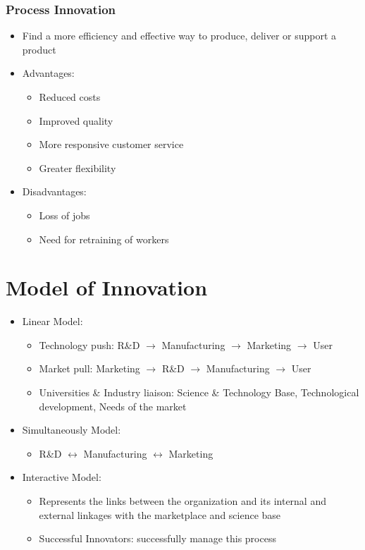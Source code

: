\documentclass[openany,12pt,a4paper]{book}
\begin{document}
\subsubsection{Process Innovation}
\begin{itemize}
    \item Find a more efficiency and effective way to produce, deliver or support a product
    \item Advantages:
    \begin{itemize}
        \item Reduced costs
        \item Improved quality
        \item More responsive customer service
        \item Greater flexibility
    \end{itemize}
    \item Disadvantages:
    \begin{itemize}
        \item Loss of jobs
        \item Need for retraining of workers
    \end{itemize}
\end{itemize}

\section{Model of Innovation}
\begin{itemize}
    \item Linear Model:
    \begin{itemize}
        \item Technology push: R\&D $\to$ Manufacturing $\to$ Marketing $\to$ User
        \item Market pull: Marketing $\to$ R\&D $\to$ Manufacturing $\to$ User
        \item Universities \& Industry liaison: Science \& Technology Base, Technological development, Needs of the market
    \end{itemize}
    \item Simultaneously Model:
    \begin{itemize}
        \item R\&D $\leftrightarrow$ Manufacturing $\leftrightarrow$ Marketing
    \end{itemize}
    \item Interactive Model:
    \begin{itemize}
        \item Represents the links between the organization and its internal and external linkages with the marketplace and science base
        \item Successful Innovators: successfully manage this process
    \end{itemize}
\end{itemize}
\end{document}
